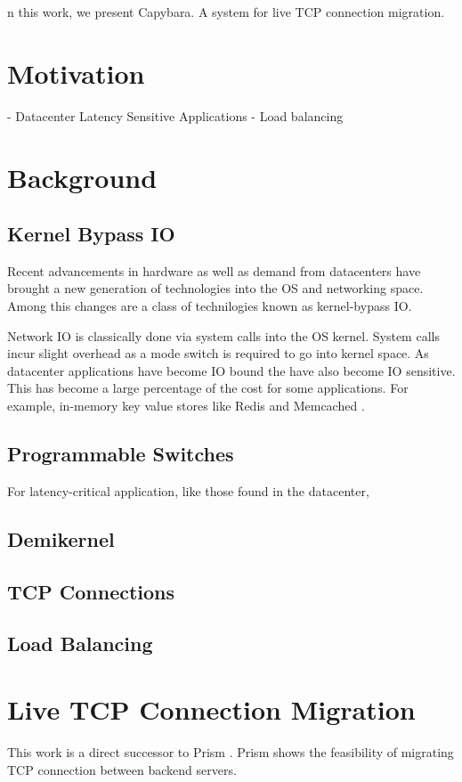 
n this work, we present Capybara. A system for live TCP connection migration.
\section{Motivation}
- Datacenter Latency Sensitive Applications
- Load balancing
\section{Background}
\subsection{Kernel Bypass IO}
Recent advancements in hardware as well as demand from datacenters have brought a new generation of technologies into the OS and networking space. Among this changes are a class of technilogies known as kernel-bypass IO.

Network IO is classically done via system calls into the OS kernel. System calls incur slight overhead as a mode switch is required to go into kernel space. As datacenter applications have become IO bound the have also become IO sensitive. This has become a large percentage of the cost for some applications. For example, in-memory key value stores like Redis \cite{redis} and Memcached \cite{memcached}.
\subsection{Programmable Switches}
For latency-critical application, like those found in the datacenter, 
\subsection{Demikernel}
\subsection{TCP Connections}
\subsection{Load Balancing}

\section{Live TCP Connection Migration}
This work is a direct successor to Prism \cite{prism}. Prism shows the feasibility of migrating TCP connection between backend servers.

